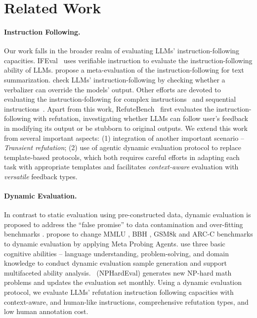 \section{Related Work}
\paragraph*{Instruction Following.}
Our work falls in the broader realm of evaluating LLMs' instruction-following capacities.
IFEval~\citep{zhou2023instruction} uses verifiable instruction to evaluate the instruction-following ability of LLMs. 
\cite{instruction-follow-summ} propose a meta-evaluation of the instruction-following for text summarization. \cite{instruction-follow-verbalizer} check LLMs’ instruction-following by checking whether a verbalizer can override the models’ output.
Other efforts are devoted to evaluating the instruction-following for complex instructions~\citep{he2024complex} and sequential instructions~\citep{chen2024sifo}.
Apart from this work, RefuteBench~\citep{yan2024refutebench} first evaluates the instruction-following with refutation, investigating whether LLMs can follow  user's feedback in modifying its output or be stubborn to original outputs. 
We extend this work from several important aspects: (1) integration of another important scenario -- \emph{Transient refutation}; (2) use of agentic dynamic evaluation protocol to replace template-based protocols, which both requires careful efforts in adapting each task with appropriate templates and facilitates \textit{context-aware} evaluation with \textit{versatile} feedback types. 

\paragraph*{Dynamic Evaluation.}
In contrast to static evaluation using pre-constructed data, 
dynamic evaluation is proposed to address the “false promise” to data contamination \citep{Bender2021,kocon2023chatgpt} and over-fitting benchmarks \citep{zhu2023dyval}.
\cite{zhu2024dyval} propose to change MMLU \citep{hendrycksmeasuring}, BBH \citep{suzgun2023challenging}, GSM8k \citep{cobbe2021training} and ARC-C \citep{clark2018think} benchmarks to dynamic evaluation by applying Meta Probing Agents.
\cite{burnell2023revealing} use three basic cognitive abilities -- language understanding, problem-solving, and domain knowledge to conduct dynamic evaluation sample generation and support multifaceted ability analysis.
\cite{fan2023nphardeval}~(NPHardEval) generates new NP-hard math problems and updates the evaluation set monthly.
Using a dynamic evaluation protocol, we evaluate LLMs' refutation instruction following capacities with context-aware, and human-like instructions, comprehensive refutation types, and low human annotation cost.

